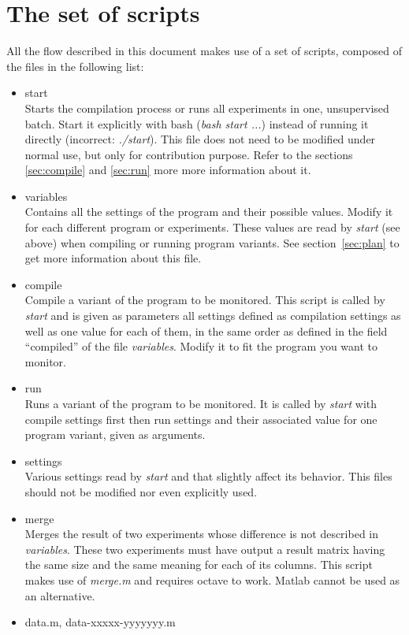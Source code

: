 \section{The set of scripts}
All the flow described in this document makes use of a set of scripts, composed of the files in the following list:
\begin{itemize}
\item start\\
Starts the compilation process or runs all experiments in one, unsupervised batch. Start it explicitly with bash (\emph{bash start ...}) instead of running it directly (incorrect: \emph{./start}). This file does not need to be modified under normal use, but only for contribution purpose. Refer to the sections \ref{sec:compile} and \ref{sec:run} more more information about it.
\item variables\\
Contains all the settings of the program and their possible values. Modify it for each different program or experiments. These values are read by \emph{start} (see above) when compiling or running program variants. See section~\ref{sec:plan} to get more information about this file. 
\item compile\\
Compile a variant of the program to be monitored. This script is called by \emph{start} and is given as parameters all settings defined as compilation settings as well as one value for each of them, in the same order as defined in the field ``compiled'' of the file \emph{variables}. Modify it to fit the program you want to monitor.
\item run\\
Runs a variant of the program to be monitored. It is called by \emph{start} with compile settings first then run settings and their associated value for one program variant, given as arguments.
\item settings\\
Various settings read by \emph{start} and that slightly affect its behavior. This files should not be modified nor even explicitly used.
\item merge\\
Merges the result of two experiments whose difference is not described in \emph{variables}. These two experiments must have output a result matrix having the same size and the same meaning for each of its columns. This script makes use of \emph{merge.m} and requires octave to work. Matlab cannot be used as an alternative.
\item data.m, data-xxxxx-yyyyyyy.m\\

\end{itemize}
